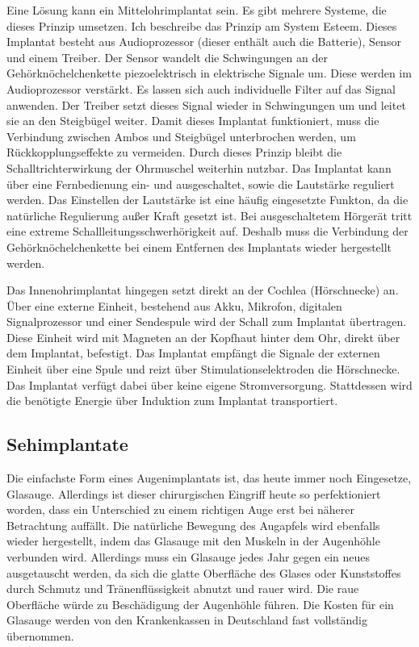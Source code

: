 Eine Lösung kann ein Mittelohrimplantat sein. Es gibt mehrere Systeme, die dieses Prinzip umsetzen.
Ich beschreibe das Prinzip am System Esteem. Dieses Implantat besteht aus Audioprozessor (dieser
enthält auch die Batterie), Sensor und einem Treiber. Der Sensor wandelt die Schwingungen an der
Gehörknöchelchenkette piezoelektrisch in elektrische Signale um. Diese werden im Audioprozessor
verstärkt. Es lassen sich auch individuelle Filter auf das Signal anwenden. Der Treiber setzt dieses
Signal wieder in Schwingungen um und leitet sie an den Steigbügel weiter. Damit dieses Implantat
funktioniert, muss die Verbindung zwischen Ambos und Steigbügel unterbrochen werden, um
Rückkopplungseffekte zu vermeiden. Durch dieses Prinzip bleibt die
Schalltrichterwirkung der Ohrmuschel weiterhin nutzbar. Das Implantat
kann über eine Fernbedienung ein- und ausgeschaltet, sowie die Lautstärke reguliert werden. Das
Einstellen der Lautstärke ist eine häufig eingesetzte Funkton, da die natürliche
Regulierung außer Kraft gesetzt ist. Bei ausgeschaltetem Hörgerät tritt eine extreme
Schallleitungsschwerhörigkeit auf. Deshalb muss die Verbindung der Gehörknöchelchenkette bei einem
Entfernen des Implantats wieder hergestellt werden.

Das Innenohrimplantat hingegen setzt direkt an der Cochlea (Hörschnecke) an. Über eine externe
Einheit, bestehend aus Akku, Mikrofon, digitalen Signalprozessor und einer Sendespule wird der
Schall zum Implantat übertragen. Diese Einheit wird mit Magneten an der Kopfhaut hinter dem Ohr,
direkt über dem Implantat, befestigt. Das Implantat empfängt die Signale der externen Einheit über
eine Spule und reizt über Stimulationselektroden die Hörschnecke. Das Implantat verfügt dabei über
keine eigene Stromversorgung. Stattdessen wird die benötigte Energie über Induktion zum Implantat
transportiert.

\subsection{Sehimplantate}
Die einfachste Form eines Augenimplantats ist, das heute immer noch Eingesetze, Glasauge. Allerdings
ist dieser chirurgischen Eingriff heute so perfektioniert worden, dass ein Unterschied zu einem
richtigen Auge erst bei näherer Betrachtung auffällt. Die natürliche Bewegung des Augapfels wird
ebenfalls wieder hergestellt, indem das Glasauge mit den Muskeln in der Augenhöhle verbunden wird.
Allerdings muss ein Glasauge jedes Jahr gegen ein neues ausgetauscht werden, da sich die glatte
Oberfläche des Glases oder Kunststoffes durch Schmutz und Tränenflüssigkeit abnutzt und rauer
wird. Die raue Oberfläche würde zu Beschädigung der Augenhöhle führen.
Die Kosten für ein Glasauge werden von den Krankenkassen in Deutschland fast vollständig übernommen.

